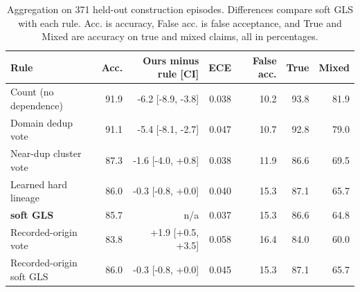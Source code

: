 \begin{table}[t]
\centering\scriptsize\setlength{\tabcolsep}{2.4pt}
\caption{Aggregation on 371 held-out construction episodes. Differences compare \system{} soft GLS with each rule. Acc. is accuracy, False acc. is false acceptance, and True and Mixed are accuracy on true and mixed claims, all in percentages.}
\label{tab:baselines}
\begin{tabular}{lrrrrrr}
\toprule
Rule & Acc. & Ours minus rule [CI] & ECE & False acc. & True & Mixed \\
\midrule
Count (no dependence) & 91.9 & -6.2 [-8.9, -3.8] & 0.038 & 10.2 & 93.8 & 81.9 \\
Domain dedup vote & 91.1 & -5.4 [-8.1, -2.7] & 0.047 & 10.7 & 92.8 & 79.0 \\
Near-dup cluster vote & 87.3 & -1.6 [-4.0, +0.8] & 0.038 & 11.9 & 86.6 & 69.5 \\
Learned hard lineage & 86.0 & -0.3 [-0.8, +0.0] & 0.040 & 15.3 & 87.1 & 65.7 \\
\textbf{\system{} soft GLS} & 85.7 & n/a & 0.037 & 15.3 & 86.6 & 64.8 \\
Recorded-origin vote & 83.8 & +1.9 [+0.5, +3.5] & 0.058 & 16.4 & 84.0 & 60.0 \\
Recorded-origin soft GLS & 86.0 & -0.3 [-0.8, +0.0] & 0.045 & 15.3 & 87.1 & 65.7 \\
\bottomrule
\end{tabular}
\end{table}
